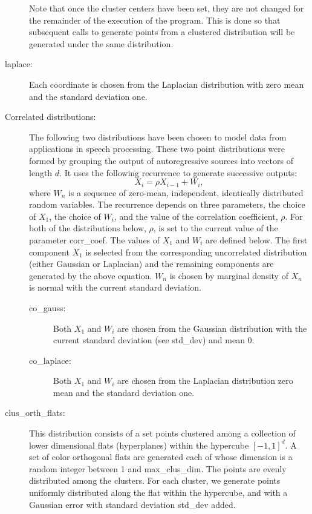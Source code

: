 \documentclass[11pt]{article}		%
\begin{document}
\begin{description}
	Note that once the cluster centers have been set, they are not
	changed for the remainder of the execution of the program.  This
	is done so that subsequent calls to generate points from a clustered
	distribution will be generated under the same distribution.
\item[\hbox{\sf laplace:}]
        Each coordinate is chosen from the Laplacian distribution with
        zero mean and the standard deviation one.
\item[Correlated distributions:]
	The following two distributions have been chosen to model data from
	applications in speech processing.  These two point distributions
	were formed by grouping the output of autoregressive sources into
	vectors of length $d$.  It uses the following recurrence to generate
	successive outputs:
	\[
		X_i = \rho X_{i-1} + W_i,
	\]
	where $W_n$ is a sequence of zero-mean, independent, identically
	distributed random variables.  The recurrence depends on three
	parameters, the choice of $X_1$, the choice of $W_i$, and the
	value of the correlation coefficient, $\rho$.  For both of the
	distributions below, $\rho$, is set to the current value of the
	parameter \textsf{corr\_coef}.  The values of $X_1$ and $W_i$ are
	defined below.  The first component $X_1$ is selected
	from the corresponding uncorrelated distribution (either Gaussian
	or Laplacian) and the remaining components are generated by the
	above equation.  $W_n$ is chosen by 
	marginal density of $X_n$ is normal with the current standard
	deviation.
	\begin{description}
	\item[\hbox{\sf co\_gauss:}]
		Both $X_1$ and $W_i$ are chosen from the Gaussian
		distribution with the current standard deviation (see
		\textsf{std\_dev}) and mean 0.
	\item[\hbox{\sf co\_laplace:}] Both $X_1$ and $W_i$ are chosen from the
		Laplacian distribution zero mean and the standard deviation
		one.
	\end{description}
\item[\hbox{\sf clus\_orth\_flats:}] 
	This distribution consists of a set points clustered among
	a collection of lower dimensional flats (hyperplanes) within the
	hypercube $[-1,1]^d$.  A set of \textsf{color} orthogonal flats are
	generated each of whose dimension is a random integer between 1
	and \textsf{max\_clus\_dim}.  The points are evenly distributed among
	the clusters.  For each cluster, we generate points uniformly
	distributed along the flat within the hypercube, and with a
	Gaussian error with standard deviation \textsf{std\_dev} added.

\end{description}
\end{document}
